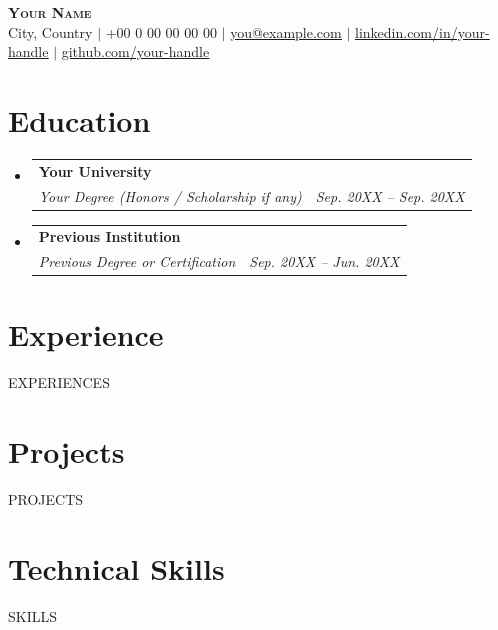 \documentclass[letterpaper,11pt]{article}
\makeatletter
\newcommand{\resumeSubheading}[4]{
  \vspace{-2pt}\item
    \begin{tabular*}{0.97\textwidth}[t]{l@{\extracolsep{\fill}}r}
      \textbf{#1} & #2 \\
      \textit{\small#3} & \textit{\small #4} \\
    \end{tabular*}\vspace{-7pt}
}
\newcommand{\resumeSubHeadingListStart}{\begin{itemize}[leftmargin=0.15in, label={}]}
\newcommand{\resumeSubHeadingListEnd}{\end{itemize}}
\makeatother
\begin{document}
\begin{center}
    \textbf{\Huge \scshape Your Name} \\ \vspace{1pt}
    City, Country $|$ \small +00 0 00 00 00 00 $|$ \href{mailto:you@example.com}{\underline{you@example.com}} $|$
    \href{https://linkedin.com/in/your-handle}{\underline{linkedin.com/in/your-handle}} $|$
    \href{https://github.com/your-handle}{\underline{github.com/your-handle}}
\end{center}


\section{Education}
  \resumeSubHeadingListStart
    \resumeSubheading
      {Your University}{}
      {Your Degree (Honors / Scholarship if any)}{Sep. 20XX -- Sep. 20XX}
    \resumeSubheading
      {Previous Institution}{}
      {Previous Degree or Certification}{Sep. 20XX -- Jun. 20XX}
  \resumeSubHeadingListEnd


\section{Experience}
{{EXPERIENCES}}

\section{Projects}
{{PROJECTS}}


\section{Technical Skills}
 \begin{itemize}[leftmargin=0.15in, label={}]
    \small{\item{
{{SKILLS}}
    }}
 \end{itemize}


\end{document}
